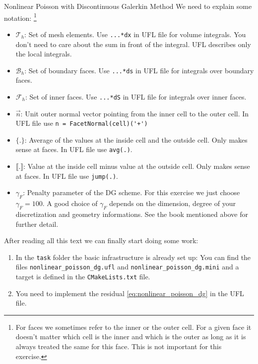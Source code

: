 \documentclass[12pt,a4paper]{article}
\newcommand\jump[1]{\llbracket #1 \rrbracket}
\newcommand\avg[1]{\{ #1 \}}
\begin{document}
\begin{Exercise}{Nonlinear Poisson with Discontinuous Galerkin Method}
  We need to explain some notation: \footnote{For faces we sometimes refer to the inner or the outer cell. For a given face it doesn't matter which cell is the inner and which is the outer as long as it is always treated the same for this face. This is not important for this exercise.}

  \begin{itemize}
  \item $\mathcal{T}_h$: Set of mesh elements. Use \lstinline{...*dx} in UFL
    file for volume integrals. You don't need to care about the sum in front of
    the integral. UFL describes only the local integrals.
  \item $\mathcal{B}_h$: Set of boundary faces. Use \lstinline{...*ds} in UFL
    file for integrals over boundary faces.
  \item $\mathcal{F}_h$: Set of inner faces. Use \lstinline{...*dS} in UFL file
    for integrals over inner faces.
  \item $\vec{n}$: Unit outer normal vector pointing from the inner cell to the outer cell. In UFL file use \lstinline{n = FacetNormal(cell)('+')}
  \item $\avg{.}$: Average of the values at the inside cell and the outside cell. Only makes sense at faces. In UFL file use \lstinline{avg(.)}.
  \item $\jump{.}$: Value at the inside cell minus value at the outside cell. Only makes sense at faces. In UFL file use \lstinline{jump(.)}.
  \item $\gamma_F$: Penalty parameter of the DG scheme. For this exercise we
    just choose $\gamma_F = 100$. A good choice of $\gamma_F$ depends on the
    dimension, degree of your discretization and geometry informations. See the
    book mentioned above for further detail.
  \end{itemize}

  After reading all this text we can finally start doing some work:
  \begin{enumerate}
  \item In the \lstinline{task} folder the basic infrastructure is already set
    up: You can find the files \lstinline{nonlinear_poisson_dg.ufl} and
    \lstinline{nonlinear_poisson_dg.mini} and a target is defined in the
    \lstinline{CMakeLists.txt} file.
  \item You need to implement the residual \eqref{eq:nonlinear_poisson_dg} in
    the UFL file.
  \end{enumerate}

\end{Exercise}
\end{document}
